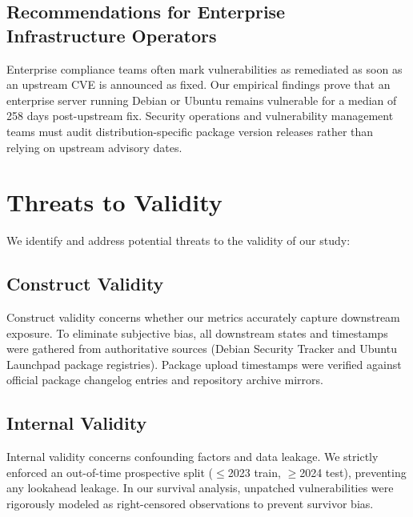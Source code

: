 \documentclass[final,5p,times,twocolumn]{elsarticle}
\begin{document}
\subsection{Recommendations for Enterprise Infrastructure Operators}
Enterprise compliance teams often mark vulnerabilities as remediated as soon as an upstream CVE is announced as fixed. Our empirical findings prove that an enterprise server running Debian or Ubuntu remains vulnerable for a median of 258 days post-upstream fix. Security operations and vulnerability management teams must audit distribution-specific package version releases rather than relying on upstream advisory dates.

\section{Threats to Validity}
\label{sec:threats}

We identify and address potential threats to the validity of our study:

\subsection{Construct Validity}
Construct validity concerns whether our metrics accurately capture downstream exposure. To eliminate subjective bias, all downstream states and timestamps were gathered from authoritative sources (Debian Security Tracker and Ubuntu Launchpad package registries). Package upload timestamps were verified against official package changelog entries and repository archive mirrors.

\subsection{Internal Validity}
Internal validity concerns confounding factors and data leakage. We strictly enforced an out-of-time prospective split ($\le$2023 train, $\ge$2024 test), preventing any lookahead leakage. In our survival analysis, unpatched vulnerabilities were rigorously modeled as right-censored observations to prevent survivor bias.
\end{document}
